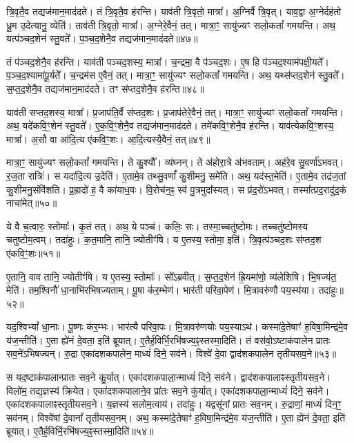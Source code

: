 त्रि॒वृतै॒व तद्यज॑मान॒माद॑दते।
तं त्रि॒वृतै॒व ह॑रन्ति।
याव॑ती त्रि॒वृतो॒ मात्रा᳚।
अ॒ग्निर्वै त्रि॒वृत्।
याव॒द्वा अ॒ग्नेर्दह॑तो धू॒म उ॒देत्यानु॒ व्येति॑।
ताव॑ती त्रि॒वृतो॒ मात्रा᳚।
अ॒ग्नेरे॒वैनं॒ तत्।
मात्रा॒ꣳ॒ सायु॑ज्यꣳ सलो॒कतां᳚ गमयन्ति।
अथ॒ यत्प॑ञ्चद॒शेन॑ स्तु॒वते᳚।
प॒ञ्च॒द॒शेनै॒व तद्यज॑मान॒माद॑दते॥४७॥

तं प॑ञ्चद॒शेनै॒व ह॑रन्ति।
याव॑ती पञ्चद॒शस्य॒ मात्रा᳚।
च॒न्द्रमा॒ वै प॑ञ्चद॒शः।
ए॒ष हि प॑ञ्चद॒श्याम॑पक्षी॒यते᳚।
प॒ञ्च॒द॒श्यामा॑पू॒र्यते᳚।
च॒न्द्रम॑स ए॒वैनं॒ तत्।
मात्रा॒ꣳ॒ सायु॑ज्यꣳ सलो॒कतां᳚ गमयन्ति।
अथ॒ यथ्स॑प्तद॒शेन॑ स्तु॒वते᳚।
स॒प्त॒द॒शेनै॒व तद्यज॑मान॒माद॑दते।
तꣳ स॑प्तद॒शेनै॒व ह॑रन्ति॥४८॥

याव॑ती सप्तद॒शस्य॒ मात्रा᳚।
प्र॒जा\-प॑ति॒र्वै स॑प्तद॒शः।
प्र॒जा\-प॑तेरे॒वैनं॒ तत्।
मात्रा॒ꣳ॒ सायु॑ज्यꣳ सलो॒कतां᳚ गमयन्ति।
अथ॒ यदे॑कवि॒ꣳ॒शेन॑ स्तु॒वते᳚।
ए॒क॒वि॒ꣳ॒शेनै॒व तद्यज॑मान॒माद॑दते।
तमे॑कवि॒ꣳ॒शेनै॒व ह॑रन्ति।
याव॑त्येक\-वि॒ꣳ॒शस्य॒ मात्रा᳚।
अ॒सौ वा आ॑दि॒त्य ए॑कवि॒ꣳ॒शः।
आ॒दि॒त्यस्यै॒वैनं॒ तत्॥४९॥

मात्रा॒ꣳ॒ सायु॑ज्यꣳ सलो॒कतां᳚ गमयन्ति।
ते कु॒श्यौ᳚।
व्य॑घ्नन्।
ते अ॑होरा॒त्रे अ॑भवताम्।
अह॑रे॒व सु॒वर्णा॑\-ऽभवत्।
र॒ज॒ता रात्रिः॑।
स यदा॑दि॒त्य उ॒देति॑।
ए॒तामे॒व तथ्सु॒वर्णां᳚ कु॒शीमनु॒ समे॑ति।
अथ॒ यद॑स्त॒मेति॑।
ए॒तामे॒व तद्र॑ज॒तां कु॒शीमनु॒संवि॑शति।
प्र॒ह्रादो॑ ह॒ वै का॑याध॒वः।
वि॒रोच॑न॒ꣴ॒ स्वं पु॒त्रमुदा᳚स्यत्।
स प्र॑द॒रो॑\-ऽभवत्।
तस्मा᳚त्प्रद॒रादु॑द॒कं नाचा॑मेत्॥५०॥\anuvakamend[आ॒दि॒त्यः प॑ञ्चद॒शस्य॒ मात्रा᳚ स्तु॒वते॑ पञ्चद॒शेनै॒व तद्यज॑मान॒माद॑दते सप्तद॒शेनै॒व ह॑रन्त्यादि॒त्यस्यै॒वैनं॒ तद्वि॑शति च॒त्वारि॑ च]

ये वै च॒त्वारः॒ स्तोमाः᳚।
कृ॒तं तत्।
अथ॒ ये पञ्च॑।
कलिः॒ सः।
तस्मा॒च्चतु॑ष्टोमः।
तच्चतु॑ष्टोमस्य चतुष्टोम॒त्वम्।
तदा॑हुः।
क॒त॒मानि॒ तानि॒ ज्योतीꣳ॑षि।
य ए॒तस्य॒ स्तोमा॒ इति॑।
त्रि॒वृत्प॑ञ्चद॒शः स॑प्तद॒श ए॑कवि॒ꣳ॒शः॥५१॥

ए॒तानि॒ वाव तानि॒ ज्योतीꣳ॑षि।
य ए॒तस्य॒ स्तोमाः᳚।
सो᳚ऽब्रवीत्।
स॒प्त॒द॒शेन॑ ह्रि॒यमा॑णो॒ व्य॑लेशिषि।
भि॒षज्य॑त॒ मेति॑।
तम॒श्विनौ॑ धा॒नाभि॑रभिषज्यताम्।
पू॒षा क॑र॒म्भेण॑।
भार॑ती परिवा॒पेण॑।
मि॒त्रावरु॑णौ पय॒स्य॑या।
तदा॑हुः॥५२॥

यद॒श्विभ्यां᳚ धा॒नाः।
पू॒ष्णः क॑र॒म्भः।
भार॑त्यै परिवा॒पः।
मि॒त्रावरु॑णयोः पय॒स्याऽथ॑।
कस्मा॑दे॒तेषाꣳ॑ ह॒विषा॒मिन्द्र॑मे॒व य॑ज॒न्तीति॑।
ए॒ता ह्ये॑नं दे॒वता॒ इति॑ ब्रूयात्।
ए॒तैर्\mbox{}ह॒विर्भि॒\-रभि॑षज्य॒ꣴ॒स्तस्मा॒दिति॑।
तं वस॑वो॒\-ऽष्टा\-क॑पालेन प्रातः सव॒ने॑\-ऽभिषज्यन्।
रु॒द्रा एका॑\-दश\-कपालेन॒ माध्यं॑ दिने॒ सव॑ने।
विश्वे॑ दे॒वा द्वाद॑शकपालेन तृतीयसव॒ने॥५३॥

स यद॒ष्टा\-क॑पालान्प्रातः सव॒ने कु॒र्यात्।
एका॑दश\-कपाला॒न्माध्यं॑ दिने॒ सव॑ने।
द्वाद॑श\-कपालाꣴस्तृतीयसव॒ने।
विलो॑म॒ तद्य॒ज्ञस्य॑ क्रियेत।
एका॑दश\-कपालाने॒व प्रा॑तः सव॒ने कु॑र्यात्।
एका॑दश\-कपाला॒न्माध्यं॑ दिने॒ सव॑ने।
एका॑दश\-कपालाꣴ\-स्तृतीयसव॒ने।
य॒ज्ञस्य॑ सलोम॒त्वाय॑।
तदा॑हुः।
यद्वसू॑नां प्रातः सव॒नम्।
रु॒द्राणां॒ माध्यं॑ दिन॒ꣳ॒ सव॑नम्।
विश्वे॑षां दे॒वानां᳚ तृतीयसव॒नम्।
अथ॒ कस्मा॑दे॒तेषाꣳ॑ ह॒विषा॒मिन्द्र॑मे॒व य॑ज॒न्तीति॑।
ए॒ता ह्ये॑नं दे॒वता॒ इति॑ ब्रूयात्।
ए॒तैर्\-\mbox{}ह॒विर्भि॒रभि॑\-षज्य॒ꣴ॒स्तस्मा॒दिति॑॥५४॥\anuvakamend[ए॒क॒वि॒ꣳ॒श आ॑हुस्तृतीयसव॒ने प्रा॑तः सव॒नं पञ्च॑ च]

